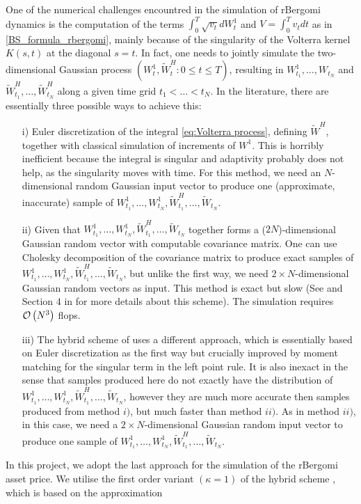 One of the numerical challenges encountred in the simulation of rBergomi dynamics  is the computation of the terms  $\int_{0}^{T} \sqrt{v_t} dW_t^1$ and $V=\int_{0}^{T} v_t dt$ as in \eqref{BS_formula_rbergomi}, mainly because of the singularity of the Volterra kernel $K(s,t)$ at the diagonal $s = t$. In fact,  one needs to jointly simulate the two-dimensional Gaussian process $(W_t^1, \widetilde{W}^H_t: 0 \le t \le T)$, resulting in $W^1_{t_1},\dots, W_{t_N}$ and $\widetilde{W}^H_{t_1},\dots, \widetilde{W}^H_{t_N}$ along a given time grid $t_1 <\dots < t_N$. In the literature, there are essentially three possible ways to achieve this:
 \begin{enumerate}
 	\item[i)] Euler discretization of the integral \eqref{eq:Volterra process}, defining $\widetilde{W}^H$, together with classical simulation of increments of $W^1$. This is horribly inefficient because the integral is singular and adaptivity probably does not help, as the singularity moves with time. For this method, we need an $N$-dimensional random Gaussian input vector to produce one (approximate, inaccurate) sample of $W^1_{t_1},\dots, W^1_{t_N}, \widetilde{W}^H_{t_1},\dots, \widetilde{W}_{t_N}$.
 	
 	\item[ii)] Given that $W^1_{t_1},\dots, W^1_{t_N}, \widetilde{W}^H_{t_1},\dots, \widetilde{W}_{t_N}$ together forms a ($2N$)-dimensional Gaussian random vector with computable covariance matrix. One can use Cholesky decomposition of the covariance matrix to produce exact samples of $W^1_{t_1},\dots, W^1_{t_N}, \widetilde{W}^H_{t_1},\dots, \widetilde{W}_{t_N}$, but unlike the first way, we need $2 \times N$-dimensional Gaussian random vectors as
 	input. This method is exact but slow (See  \cite{bayer2016pricing} and Section $4$ in \cite{bayer2017short} for more details about this scheme).   The simulation  requires ${\mathcal{O}}\left(N^3\right)$ flops. 
 	
 	\item[iii)]  The hybrid scheme of \cite{bennedsen2017hybrid} uses a different approach, which is essentially based on  Euler discretization as the first way but crucially improved by moment
 	matching for the singular term in the left point rule. It is also
 	inexact in the sense that samples produced here do not exactly have the distribution of $W^1_{t_1},\dots, W^1_{t_N}, \widetilde{W}^H_{t_1},\dots, \widetilde{W}_{t_N}$, however they are much more accurate then samples produced from method $i)$, but much faster than method $ii)$. As in method $ii)$, in this case, we need a $2 \times N$-dimensional Gaussian random input vector to produce one
 	sample of $W^1_{t_1},\dots, W^1_{t_N}, \widetilde{W}^H_{t_1},\dots, \widetilde{W}_{t_N}$.
 \end{enumerate}
In this project, we adopt the last approach for the simulation of the rBergomi asset price. We utilise the first order variant $(\kappa=1) $ of the hybrid scheme \cite{bennedsen2017hybrid}, which is based on the approximation

